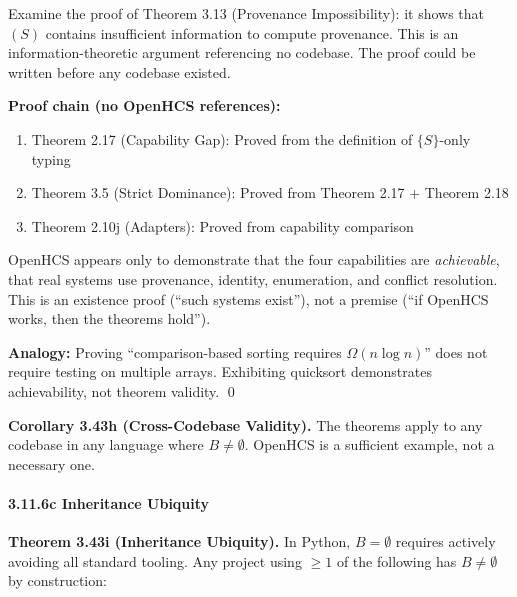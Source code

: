 Examine the proof of Theorem 3.13 (Provenance Impossibility): it shows
that \((S)\) contains insufficient information to compute provenance.
This is an information-theoretic argument referencing no codebase. The
proof could be written before any codebase existed.

\textbf{Proof chain (no OpenHCS references):}
\begin{enumerate}
\tightlist
\item Theorem 2.17 (Capability Gap): Proved from the definition of
  $\{S\}$-only typing
\item Theorem 3.5 (Strict Dominance): Proved from Theorem 2.17 + Theorem 2.18
\item Theorem 2.10j (Adapters): Proved from capability comparison
\end{enumerate}

OpenHCS appears only to demonstrate that the four capabilities are
\emph{achievable}, that real systems use provenance, identity,
enumeration, and conflict resolution. This is an existence proof
(``such systems exist''), not a premise (``if OpenHCS works, then
the theorems hold'').

\textbf{Analogy:} Proving ``comparison-based sorting requires
\(\Omega(n \log n)\)'' does not require testing on multiple arrays.
Exhibiting quicksort demonstrates achievability, not theorem validity.
\qed

\textbf{Corollary 3.43h (Cross-Codebase Validity).} The theorems apply
to any codebase in any language where \(B \neq \emptyset\). OpenHCS is a
sufficient example, not a necessary one.

\paragraph{3.11.6c Inheritance Ubiquity}\label{c-inheritance-ubiquity}

\textbf{Theorem 3.43i (Inheritance Ubiquity).} In Python,
\(B = \emptyset\) requires actively avoiding all standard tooling. Any
project using \(\geq 1\) of the following has \(B \neq \emptyset\) by
construction:

